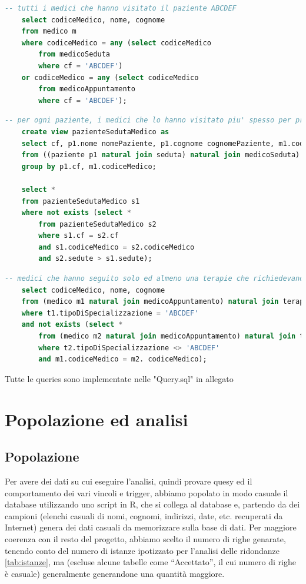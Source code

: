 \documentclass[11pt]{article}
\begin{document}
\begin{lstlisting}[language=SQL]
    -- tutti i medici che hanno visitato il paziente ABCDEF
    select codiceMedico, nome, cognome
    from medico m
    where codiceMedico = any (select codiceMedico
        from medicoSeduta
        where cf = 'ABCDEF')
    or codiceMedico = any (select codiceMedico
        from medicoAppuntamento
        where cf = 'ABCDEF');
\end{lstlisting}
\begin{lstlisting}[language=SQL]
    -- per ogni paziente, i medici che lo hanno visitato piu' spesso per problemi occasionali
    create view pazienteSedutaMedico as
    select cf, p1.nome nomePaziente, p1.cognome cognomePaziente, m1.codiceMedico codiceMedico, m1.nome nomeMedico, m1.cognome cognomeMedico, count(*) sedute
    from ((paziente p1 natural join seduta) natural join medicoSeduta) join medico m1 on medicoSeduta.codiceMedico = m1.codiceMedico
    group by p1.cf, m1.codiceMedico;
    
    select *
    from pazienteSedutaMedico s1
    where not exists (select *
        from pazienteSedutaMedico s2
        where s1.cf = s2.cf
        and s1.codiceMedico = s2.codiceMedico
        and s2.sedute > s1.sedute);
\end{lstlisting}
\begin{lstlisting}[language=SQL]
    -- medici che hanno seguito solo ed almeno una terapie che richiedevano la specializzazione ABCDEF
    select codiceMedico, nome, cognome 
    from (medico m1 natural join medicoAppuntamento) natural join terapiaProlungata t1
    where t1.tipoDiSpecializzazione = 'ABCDEF'
    and not exists (select *
        from (medico m2 natural join medicoAppuntamento) natural join terapiaProlungata t2
        where t2.tipoDiSpecializzazione <> 'ABCDEF'
        and m1.codiceMedico = m2. codiceMedico);
\end{lstlisting}
Tutte le queries sono implementate nelle "Query.sql" in allegato

\section{Popolazione ed analisi}
\subsection{Popolazione}
\label{pop:popolazione}
Per avere dei dati su cui eseguire l'analisi, quindi provare quesy ed il comportamento dei vari vincoli e trigger, abbiamo popolato in modo casuale il database utilizzando uno script in R, che si collega al database e, partendo da dei campioni (elenchi casuali di nomi, cognomi, indirizzi, date, etc. recuperati da Internet) genera dei dati casuali da memorizzare sulla base di dati.
Per maggiore coerenza con il resto del progetto, abbiamo scelto il numero di righe genarate, tenendo conto del numero di istanze ipotizzato per l'analisi delle ridondanze \ref{tab:istanze}, ma (escluse alcune tabelle come ``Accettato'', il cui numero di righe è casuale) generalmente generandone una quantità maggiore.
\end{document}
